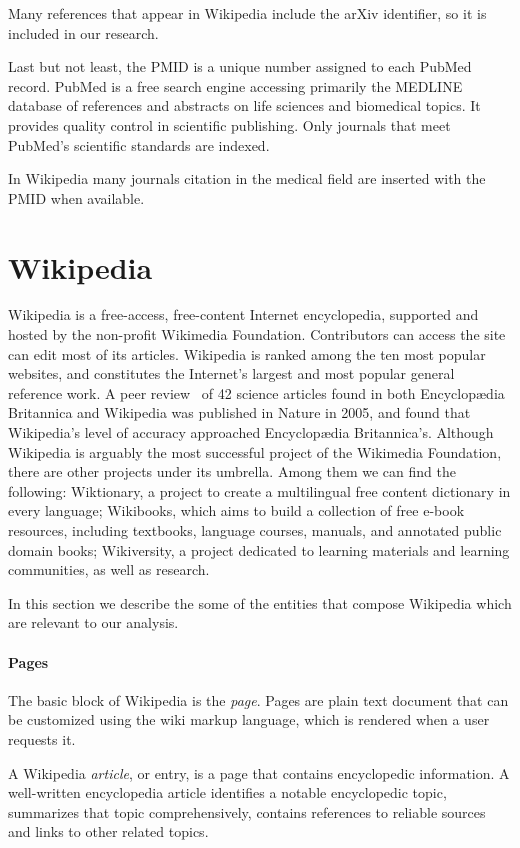 Many references that appear in Wikipedia include the arXiv identifier, so it is included in our research.

Last but not least, the \acf{PMID} is a unique number assigned to each PubMed record.
PubMed is a free search engine accessing primarily the MEDLINE database of references and abstracts on life sciences and biomedical topics.
It provides quality control in scientific publishing. Only journals that meet PubMed's scientific standards are indexed.

In Wikipedia many journals citation in the medical field are inserted with the \ac{PMID} when available.



\section{Wikipedia}
\label{sec:wiki}
Wikipedia is a free-access, free-content Internet encyclopedia, supported and hosted by the non-profit Wikimedia Foundation.
Contributors can access the site can edit most of its articles.
Wikipedia is ranked among the ten most popular websites, and constitutes the Internet's largest and most popular general reference work.
A peer review~\cite{Giles2005} of 42 science articles found in both Encyclopædia Britannica and Wikipedia was published in Nature in 2005, and found that Wikipedia's level of accuracy approached Encyclopædia Britannica's.
Although Wikipedia is arguably the most successful project of the Wikimedia Foundation, there are other projects under its umbrella.
Among them we can find the following: Wiktionary, a project to create a multilingual free content dictionary in every language; Wikibooks, which aims to build a collection of free e-book resources, including textbooks, language courses, manuals, and annotated public domain books; Wikiversity, a project dedicated to learning materials and learning communities, as well as research.

In this section we describe the some of the entities that compose Wikipedia which are relevant to our analysis.

\paragraph{Pages}
The basic block of Wikipedia is the \emph{page}.
Pages are plain text document that can be customized using the wiki markup language, which is rendered when a user requests it.

A Wikipedia \emph{article}, or entry, is a page that contains encyclopedic information.
A well-written encyclopedia article identifies a notable encyclopedic topic, summarizes that topic comprehensively, contains references to reliable sources and links to other related topics.

